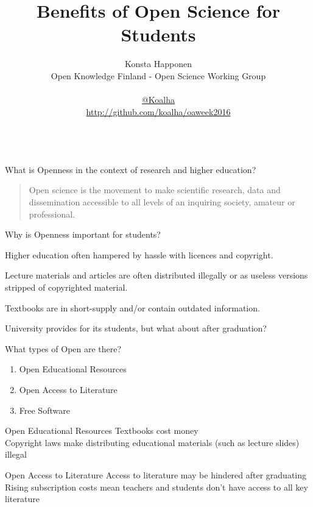 \documentclass[]{beamer}
\title{Benefits of Open Science for Students}
\author{\parbox{\textwidth}{Konsta Happonen\\
    Open Knowledge Finland - Open Science Working Group\\
    \\
    \href{http://twitter.com/koalha}{@Koalha}\\
    \url{http://github.com/koalha/oaweek2016}}\\
}
\date{}
\begin{document}
\maketitle


\begin{frame}{What is Openness in the context of research and higher education?}

  \begin{quote}
    Open science is the movement to make scientific research, data and dissemination accessible to all levels of an inquiring society, amateur or professional.\\
  \end{quote}

\end{frame}

\begin{frame}{Why is Openness important for students?}

  Higher education often hampered by hassle with licences and copyright.

  Lecture materials and articles are often distributed illegally or as useless versions stripped of copyrighted material.

  Textbooks are in short-supply and/or contain outdated information.

  University provides for its students, but what about after graduation?

\end{frame}

\begin{frame}{What types of Open are there?}
  \begin{enumerate}
  \item Open Educational Resources
  \item Open Access to Literature
  \item Free Software
  \end{enumerate}
\end{frame}

\begin{frame}{Open Educational Resources}
  Textbooks cost money\\
  Copyright laws make distributing educational materials (such as lecture slides) illegal
\end{frame}

\begin{frame}{Open Access to Literature}
  Access to literature may be hindered after graduating\\
  Rising subscription costs mean teachers and students don't have access to all key literature
\end{frame}
\end{document}
